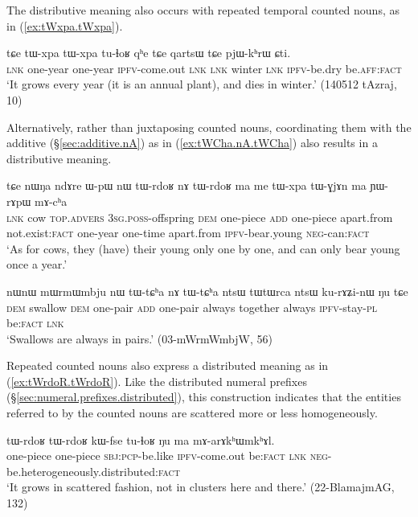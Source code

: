 The distributive meaning also occurs with repeated temporal counted nouns, as in (\ref{ex:tWxpa.tWxpa}).

\begin{exe}
	\ex \label{ex:tWxpa.tWxpa}
	\gll tɕe tɯ-xpa tɯ-xpa tu-ɬoʁ qʰe tɕe qartsɯ tɕe pjɯ-kʰrɯ ɕti. \\
	\textsc{lnk} one-year one-year \textsc{ipfv}-come.out \textsc{lnk} \textsc{lnk} winter \textsc{lnk}  \textsc{ipfv}-be.dry be.\textsc{aff}:\textsc{fact} \\
	\glt  `It grows every year (it is an annual plant), and dies in winter.' (140512 tAzraj, 10)
\end{exe}

Alternatively, rather than juxtaposing counted nouns, coordinating them with the additive  (§\ref{sec:additive.nA}) as in (\ref{ex:tWCha.nA.tWCha}) also results in a distributive meaning.

\begin{exe}
	\ex \label{ex:tWrdoʁ.nA.tWrdoʁ}
	\gll  tɕe nɯŋa ndɤre ɯ-pɯ nɯ tɯ-rdoʁ nɤ tɯ-rdoʁ ma me tɯ-xpa tɯ-ɣjɤn ma ɲɯ-rɤpɯ mɤ-cʰa \\
	\textsc{lnk} cow \textsc{top}.\textsc{advers} \textsc{3sg}.\textsc{poss}-offspring \textsc{dem} one-piece \textsc{add} one-piece apart.from not.exist:\textsc{fact}  one-year one-time apart.from \textsc{ipfv}-bear.young \textsc{neg}-can:\textsc{fact} \\
	\glt `As for cows, they (have) their young only one by one, and can only bear young once a year.'
\end{exe}

\begin{exe}
	\ex \label{ex:tWCha.nA.tWCha}
	\gll nɯnɯ mɯrmɯmbju nɯ tɯ-tɕʰa nɤ tɯ-tɕʰa ntsɯ tɯtɯrca ntsɯ ku-rɤʑi-nɯ ŋu tɕe \\
	\textsc{dem} swallow \textsc{dem} one-pair \textsc{add}  one-pair  always together always \textsc{ipfv}-stay-\textsc{pl} be:\textsc{fact} \textsc{lnk}  \\
	\glt `Swallows are always in pairs.' (03-mWrmWmbjW, 56)
\end{exe}

Repeated counted nouns also express a distributed meaning as in (\ref{ex:tWrdoR.tWrdoR}). Like the distributed numeral prefixes (§\ref{sec:numeral.prefixes.distributed}), this construction indicates that the entities referred to by the counted nouns are scattered more or less homogeneously.

\begin{exe}
	\ex \label{ex:tWrdoR.tWrdoR}
	\gll  tɯ-rdoʁ tɯ-rdoʁ kɯ-fse tu-ɬoʁ ŋu ma mɤ-arɤkʰɯmkʰɤl. \\
	one-piece one-piece \textsc{sbj}:\textsc{pcp}-be.like \textsc{ipfv}-come.out  be:\textsc{fact} \textsc{lnk} \textsc{neg}-be.heterogeneously.distributed:\textsc{fact} \\
	\glt `It grows in scattered fashion, not in clusters here and there.' (22-BlamajmAG, 132)
\end{exe}


